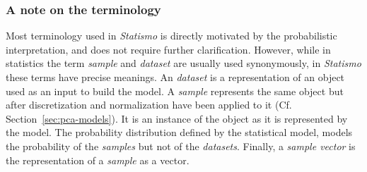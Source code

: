 \documentclass{InsightArticle}
\newcommand{\Statismo}{\emph{Statismo}\xspace}
\begin{document}
\subsubsection{A note on the terminology}
Most terminology used in \Statismo is directly motivated by the
probabilistic interpretation, and does not require further
clarification.  However, while in statistics the term \emph{sample} and
\emph{dataset} are usually used synonymously, in \Statismo these terms have precise
meanings.  An \emph{dataset} is a representation of an object used as an input to build the model.  A \emph{sample}
represents the same object but after discretization and normalization have been applied
to it (Cf. Section~\ref{sec:pca-models}).  It is an instance of the
object as it is represented by the model.  The probability distribution defined by the statistical model, 
models the probability of the \emph{samples} but not of the \emph{datasets}. 
Finally, a \emph{sample
 vector} is the representation of a \emph{sample} as a vector. 
\end{document}
